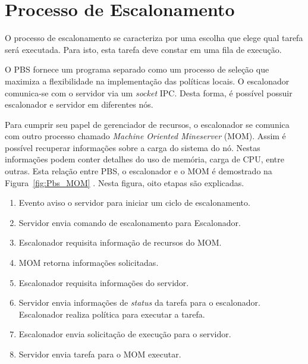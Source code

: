 \section{Processo de Escalonamento}

O processo de escalonamento se caracteriza por uma escolha que elege qual tarefa será executada. Para isto, esta tarefa deve constar em uma fila de execução.

O PBS fornece um programa separado como um processo de seleção que maximiza a flexibilidade na implementação das políticas locais. O escalonador comunica-se com o servidor via um \emph{socket} IPC. Desta forma, é possível possuir escalonador e servidor em diferentes nós.

Para cumprir seu papel de gerenciador de recursos, o escalonador se comunica com outro processo chamado \emph{Machine Oriented Mineserver} (MOM). Assim é possível recuperar informações sobre a carga do sistema do nó. Nestas informações podem conter detalhes do uso de memória, carga de CPU, entre outras. Esta relação entre PBS, o escalonador e o MOM é demostrado na Figura~\ref{fig:Pbs_MOM} \cite{Bayucan1998}. Nesta figura, oito etapas são explicadas.

\begin{center}
	\begin{enumerate}
		\item Evento aviso o servidor para iniciar um ciclo de escalonamento.
		\item Servidor envia comando de escalonamento para Escalonador.
		\item Escalonador requisita informação de recursos do MOM.
		\item MOM retorna informações solicitadas.
		\item Escalonador requisita informações do servidor.
		\item Servidor envia informações de \emph{status} da tarefa para o escalonador. Escalonador realiza política para executar a tarefa.
		\item Escalonador envia solicitação de execução para o servidor.
		\item Servidor envia tarefa para o MOM executar.
	\end{enumerate}
\end{center}

